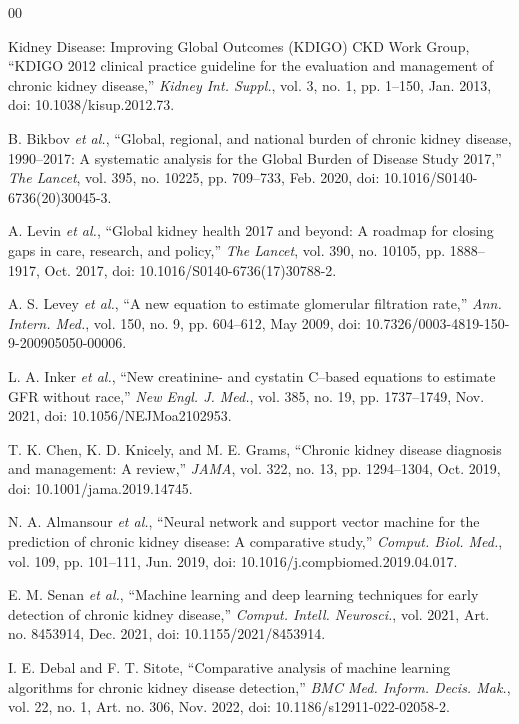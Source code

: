 \documentclass[10pt,conference]{IEEEtran}
\begin{document}
{\fontsize{6.2pt}{7.2pt}\selectfont
\begin{thebibliography}{00}
\setlength{\itemsep}{0pt}
\setlength{\parskip}{0pt}

Kidney Disease: Improving Global Outcomes (KDIGO) CKD Work Group, ``KDIGO 2012 clinical practice guideline for the evaluation and management of chronic kidney disease,'' \emph{Kidney Int. Suppl.}, vol. 3, no. 1, pp. 1--150, Jan. 2013, doi: 10.1038/kisup.2012.73.

B. Bikbov \emph{et al.}, ``Global, regional, and national burden of chronic kidney disease, 1990--2017: A systematic analysis for the Global Burden of Disease Study 2017,'' \emph{The Lancet}, vol. 395, no. 10225, pp. 709--733, Feb. 2020, doi: 10.1016/S0140-6736(20)30045-3.

A. Levin \emph{et al.}, ``Global kidney health 2017 and beyond: A roadmap for closing gaps in care, research, and policy,'' \emph{The Lancet}, vol. 390, no. 10105, pp. 1888--1917, Oct. 2017, doi: 10.1016/S0140-6736(17)30788-2.

A. S. Levey \emph{et al.}, ``A new equation to estimate glomerular filtration rate,'' \emph{Ann. Intern. Med.}, vol. 150, no. 9, pp. 604--612, May 2009, doi: 10.7326/0003-4819-150-9-200905050-00006.

L. A. Inker \emph{et al.}, ``New creatinine- and cystatin C--based equations to estimate GFR without race,'' \emph{New Engl. J. Med.}, vol. 385, no. 19, pp. 1737--1749, Nov. 2021, doi: 10.1056/NEJMoa2102953.

T. K. Chen, K. D. Knicely, and M. E. Grams, ``Chronic kidney disease diagnosis and management: A review,'' \emph{JAMA}, vol. 322, no. 13, pp. 1294--1304, Oct. 2019, doi: 10.1001/jama.2019.14745.

N. A. Almansour \emph{et al.}, ``Neural network and support vector machine for the prediction of chronic kidney disease: A comparative study,'' \emph{Comput. Biol. Med.}, vol. 109, pp. 101--111, Jun. 2019, doi: 10.1016/j.compbiomed.2019.04.017.

E. M. Senan \emph{et al.}, ``Machine learning and deep learning techniques for early detection of chronic kidney disease,'' \emph{Comput. Intell. Neurosci.}, vol. 2021, Art. no. 8453914, Dec. 2021, doi: 10.1155/2021/8453914.

I. E. Debal and F. T. Sitote, ``Comparative analysis of machine learning algorithms for chronic kidney disease detection,'' \emph{BMC Med. Inform. Decis. Mak.}, vol. 22, no. 1, Art. no. 306, Nov. 2022, doi: 10.1186/s12911-022-02058-2.


\end{thebibliography}}
\end{document}
